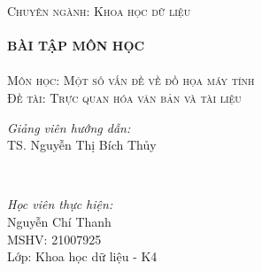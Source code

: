 \documentclass[14pt, a4paper]{article}
\numberwithin{equation}{section}
\numberwithin{figure}{section}
\numberwithin{dl}{section}
\numberwithin{md}{section}
\numberwithin{bd}{section}
\numberwithin{dn}{section}
\numberwithin{hq}{section}
\begin{document}
\begin{titlepage}
        \textsc{\Large Chuyên ngành: Khoa học dữ liệu}\\[0.5cm] %



        \HRule \\[0.4cm]
        { \huge \bfseries BÀI TẬP MÔN HỌC}\\[0.4cm] %
        \HRule \\[1.5cm]

        \textsc{\Large Môn học: Một số vấn đề về đồ họa máy tính}\\[1cm] %


        \textsc{\Large Đề tài: Trực quan hóa văn bản và tài liệu}\\[2cm]


        \begin{minipage}{0.4\textwidth}
            \begin{flushleft} \large
            \emph{Giảng viên hướng dẫn:} \\
            TS. Nguyễn Thị Bích Thủy %
            \end{flushleft}
        \end{minipage}\\[0.5cm]

        \begin{minipage}{0.4\textwidth}
        \begin{flushleft} \large
        \emph{Học viên thực hiện:}\\
        Nguyễn Chí Thanh \\
        MSHV: 21007925 \\ %
        Lớp: Khoa học dữ liệu - K4
        \end{flushleft}
        \end{minipage}




\end{titlepage}
\end{document}
